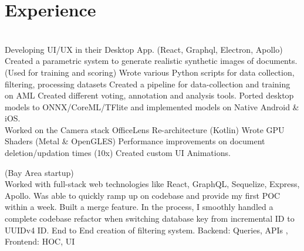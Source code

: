 \documentclass[]{deedy-resume-openfont}
\begin{document}
\begin{minipage}[t]{0.66\textwidth} 


\section{Experience}
\\
Developing UI/UX in their Desktop App. (React, Graphql, Electron, Apollo)\\
\textbullet Created a parametric system to generate realistic synthetic images of documents. (Used for training and scoring)
\textbullet Wrote various Python scripts for data collection, filtering, processing datasets \textbullet Created a pipeline for data-collection and training on AML \textbullet Created different voting, annotation and analysis tools.  \textbullet Ported desktop models to ONNX/CoreML/TFlite and implemented models on Native Android \& iOS. \\
\textbullet  Worked on the Camera stack \textbullet  OfficeLens Re-architecture (Kotlin) \textbullet  Wrote GPU Shaders (Metal \& OpenGLES) \textbullet  Performance improvements on document deletion/updation times (10x)
\textbullet Created custom UI Animations.
\sectionsep

 (Bay Area startup) \\
Worked with full-stack web technologies like React, GraphQL, Sequelize, Express, Apollo. \textbullet Was able to quickly ramp up on codebase and provide my first POC within a week.
\textbullet Built a merge feature. In the process, I smoothly handled a complete codebase refactor when switching database key from incremental ID to UUIDv4 ID.
\textbullet End to End creation of filtering system. Backend: Queries, APIs , Frontend: HOC, UI



\end{minipage}
\end{document}

